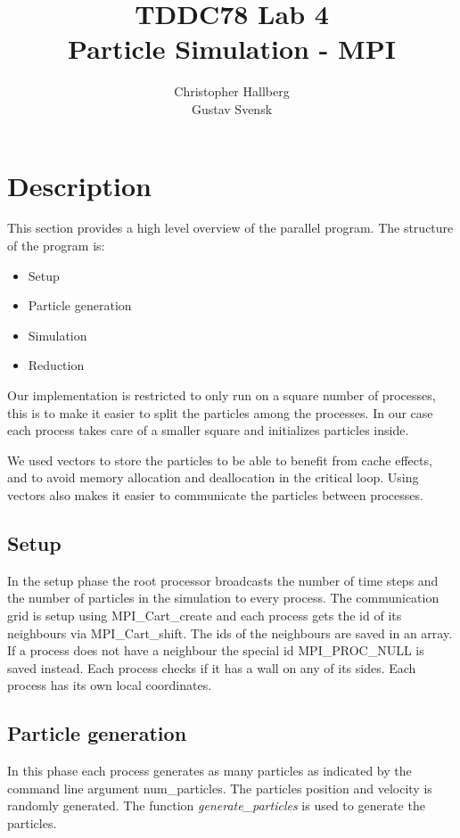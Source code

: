 \documentclass[a4paper, 12pt]{article}
\begin{document}
\title{TDDC78 Lab 4\\
        Particle Simulation - MPI}
\author{Christopher Hallberg \\
        Gustav Svensk}
\maketitle

\thispagestyle{empty}

\newpage
\setcounter{page}{1}
\tableofcontents
\newpage

\section{Description}
This section provides a high level overview of the parallel program.
The structure of the program is:
\begin{itemize}
\item Setup
\item Particle generation
\item Simulation
\item Reduction
\end{itemize}
Our implementation is restricted to only run on a square number of processes,
this is to make it easier to split the particles among the processes. In our case
each process takes care of a smaller square and initializes particles inside.

We used vectors to store the particles to be able to benefit from cache effects,
and to avoid memory allocation and deallocation in the critical loop.
Using vectors also makes it easier to communicate the particles between processes.

\subsection{Setup}
In the setup phase the root processor broadcasts the number of time steps and
the number of particles in the simulation to every process. The communication
grid is setup using MPI\_Cart\_create and each process gets the id of its
neighbours via MPI\_Cart\_shift. The ids of the neighbours are saved in an
array. If a process does not have a neighbour the special id MPI\_PROC\_NULL is
saved instead. Each process checks if it has a wall on any of its sides. 
Each process has its own local coordinates.

\subsection{Particle generation}
In this phase each process generates as many particles as indicated by the
command line argument num\_particles. The particles position and velocity is
randomly generated. The function \textit{generate\_particles} is used to generate
the particles.
\end{document}
